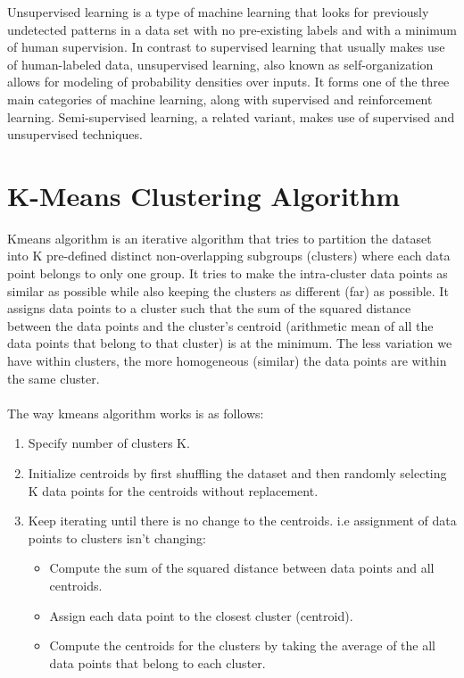 Unsupervised learning is a type of machine learning that looks for previously undetected patterns in a data set with no pre-existing labels and with a minimum of human supervision. In contrast to supervised learning that usually makes use of human-labeled data, unsupervised learning, also known as self-organization allows for modeling of probability densities over inputs. It forms one of the three main categories of machine learning, along with supervised and reinforcement learning. Semi-supervised learning, a related variant, makes use of supervised and unsupervised techniques.

\section{K-Means Clustering Algorithm}
	Kmeans algorithm is an iterative algorithm that tries to partition the dataset into K pre-defined distinct non-overlapping subgroups (clusters) where each data point belongs to only one group. It tries to make the intra-cluster data points as similar as possible while also keeping the clusters as different (far) as possible. It assigns data points to a cluster such that the sum of the squared distance between the data points and the cluster’s centroid (arithmetic mean of all the data points that belong to that cluster) is at the minimum. The less variation we have within clusters, the more homogeneous (similar) the data points are within the same cluster.\\\\

	The way kmeans algorithm works is as follows:
	\begin{enumerate}
		\item Specify number of clusters K.
		\item Initialize centroids by first shuffling the dataset and then randomly selecting K data points for the centroids without replacement.
		\item Keep iterating until there is no change to the centroids. i.e assignment of data points to clusters isn’t changing: 
		\begin{itemize}
			\item Compute the sum of the squared distance between data points and all centroids.
			\item Assign each data point to the closest cluster (centroid).
			\item Compute the centroids for the clusters by taking the average of the all data points that belong to each cluster.
		\end{itemize}
	\end{enumerate}

